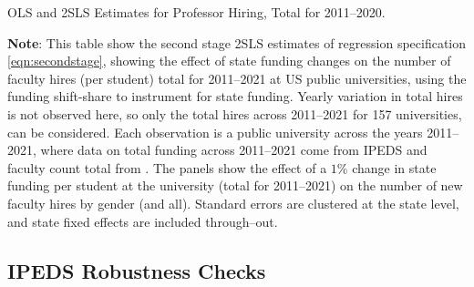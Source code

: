 \begin{table}[h!]
    \singlespacing
    \centering
    \caption{OLS and 2SLS Estimates for Professor Hiring, Total for 2011--2020.}
    \makebox[\textwidth][c]{}
    \label{tab:hiring-shock-reg}
    \justify
    \footnotesize
    \textbf{Note}: 
    This table show the second stage 2SLS estimates of regression specification \eqref{eqn:secondstage}, showing the effect of state funding changes on the number of faculty hires (per student) total for 2011--2021 at US public universities, using the funding shift-share to instrument for state funding.
    Yearly variation in total hires is not observed here, so only the total hires across 2011--2021 for 157 universities, can be considered.
    Each observation is a public university across the years 2011--2021, where data on total funding across 2011--2021 come from IPEDS and faculty count total from \citep{wapman2022quantifying,wapman2022zenodo}.
    The panels show the effect of a $1$\% change in state funding per student at the university (total for 2011--2021) on the number of new faculty hires by gender (and all).
    Standard errors are clustered at the state level, and state fixed effects are included through--out.
\end{table}

\newpage
\subsection{IPEDS Robustness Checks}


